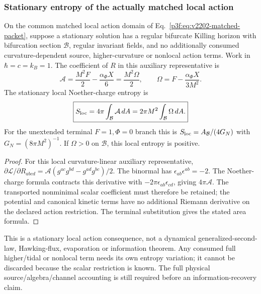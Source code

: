 \documentclass[12pt,a4paper]{article}
\begin{document}
\subsubsection{Stationary entropy of the actually matched local action}
\begin{corollary}
\label{p8:cor:v2210-lit-local-wald-entropy}
On the common matched local action domain of
Eq.~\eqref{p3f:eq:v2202-matched-packet}, suppose a stationary solution has
a regular bifurcate Killing horizon with bifurcation section $\mathcal B$,
regular invariant fields, and no additionally consumed curvature-dependent
source, higher-curvature or nonlocal action terms. Work in
$\hbar=c=k_B=1$. The coefficient of $R$ in this auxiliary representative is
\[
 \mathcal A=\frac{M^2F}{2}-\frac{\alpha_\Phi X}{6}
          =\frac{M^2\Omega}{2},\qquad
 \Omega=F-\frac{\alpha_\Phi X}{3M^2}.
\]
The stationary local Noether-charge entropy is
\begin{equation}
\label{p8:eq:v2210-lit-local-wald-entropy}
 \boxed{S_{\rm loc}=4\pi\int_{\mathcal B}\mathcal A\,dA
                     =2\pi M^2\int_{\mathcal B}\Omega\,dA.}
\end{equation}
For the unextended terminal $F=1,\Phi=0$ branch this is
$S_{\rm loc}=A_{\mathcal B}/(4G_N)$ with $G_N=(8\pi M^2)^{-1}$.
If $\Omega>0$ on $\mathcal B$, this local entropy is positive.
\end{corollary}
\begin{proof}
For this local curvature-linear auxiliary representative,
$\partial\mathcal L/\partial R_{abcd}
=\mathcal A(g^{ac}g^{bd}-g^{ad}g^{bc})/2$.
The binormal has $\epsilon_{ab}\epsilon^{ab}=-2$.
The Noether-charge formula \cite{IyerWald1994} contracts this derivative
with $-2\pi\epsilon_{ab}\epsilon_{cd}$, giving $4\pi\mathcal A$.
The transported nonminimal scalar coefficient must therefore be retained;
the potential and canonical kinetic terms have no additional Riemann
derivative on the declared action restriction. The terminal substitution
gives the stated area formula.
\end{proof}
This is a stationary local action consequence, not a dynamical
generalized-second-law, Hawking-flux, evaporation or information theorem.
Any consumed full higher/tidal or nonlocal term needs its own entropy
variation; it cannot be discarded because the scalar restriction is known.
The full physical source/algebra/channel accounting is still required
before an information-recovery claim.
\end{document}
